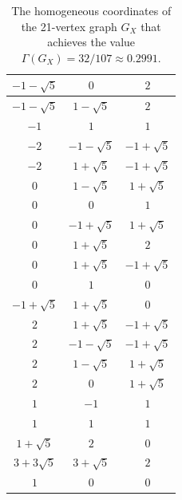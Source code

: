 \documentclass[11pt]{amsart}
\numberwithin{equation}{section}
\begin{document}
\begin{table}[]
    \centering
    {\tiny
\begin{tabular}{|c|c|c|}
        \hline
    
$-1 - \sqrt{5}$ & $0$ & $2$ \\
\hline
$-1 - \sqrt{5}$ & $1 - \sqrt{5}$ & $2$ \\
\hline
$-1$ & $1$ & $1$ \\
\hline
$-2$ & $-1 - \sqrt{5}$ & $-1 + \sqrt{5}$ \\
\hline
$-2$ & $1 + \sqrt{5}$ & $-1 + \sqrt{5}$ \\
\hline
$0$ & $1 - \sqrt{5}$ & $1 + \sqrt{5}$ \\
\hline
$0$ & $0$ & $1$ \\
\hline
$0$ & $-1 + \sqrt{5}$ & $1 + \sqrt{5}$ \\
\hline
$0$ & $1 + \sqrt{5}$ & $2$ \\
\hline
$0$ & $1 + \sqrt{5}$ & $-1 + \sqrt{5}$ \\
\hline
$0$ & $1$ & $0$ \\
\hline
$-1 + \sqrt{5}$ & $1 + \sqrt{5}$ & $0$ \\
\hline
$2$ & $1 + \sqrt{5}$ & $-1 + \sqrt{5}$ \\
\hline
$2$ & $-1 - \sqrt{5}$ & $-1 + \sqrt{5}$ \\
\hline
$2$ & $1 - \sqrt{5}$ & $1 + \sqrt{5}$ \\
\hline
$2$ & $0$ & $1 + \sqrt{5}$ \\
\hline
$1$ & $-1$ & $1$ \\
\hline
$1$ & $1$ & $1$ \\
\hline
$1 + \sqrt{5}$ & $2$ & $0$ \\
\hline
$3 + 3\sqrt{5}$ & $3 + \sqrt{5}$ & $2$ \\
\hline
$1$ & $0$ & $0$ \\
\hline

\end{tabular}
}
    \caption{The homogeneous coordinates of the 21-vertex graph $G_X$ that achieves the value $\Gamma(G_X)=32/107\approx0.2991$.}
    \label{tab:GFCN X21 coordinates}
\end{table}

\clearpage
\end{document}

